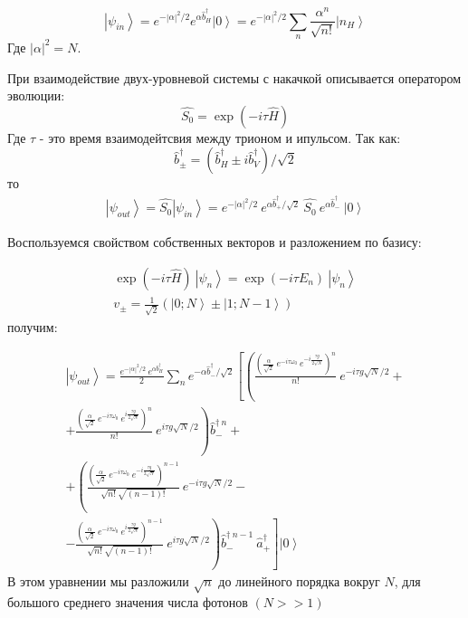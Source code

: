\documentclass[11pt]{article}    %
\begin{document}
\begin{equation}
    \left| \psi_{in} \right> = e^{-\left| \alpha \right|^2 / 2} e^{\alpha \hat{b}^{\dag}_H} \left| 0 \right> = e^{-\left| \alpha \right|^2 / 2} \sum_n \frac{\alpha^n}{\sqrt{n!}}  \left| n_H \right>
\end{equation}
Где $ |\alpha|^2 = N $.
\par При взаимодействие двух-уровневой системы с накачкой описывается оператором эволюции:
\begin{equation}
    \hat{S_0} = \exp\left( -i \tau \hat{H} \right)
\end{equation}
Где $ \tau $ - это время взаимодейтсвия между трионом и ипульсом.
Так как:
\begin{equation}
    \hat{b}^{\dag}_{\pm} = \left( \hat{b}^{\dag}_{H} \pm i \hat{b}^{\dag}_{V} \right) / \sqrt{2}
\end{equation}
то
\begin{gather}
    \left| \psi_{out} \right> = \hat{S_0} \left| \psi_{in} \right> = e^{-\left| \alpha \right|^2 / 2} \ e^{\alpha \hat{b}^{\dag}_{+} / \sqrt{2}} \ \hat{S_0}  \ e^{\alpha \hat{b}^{\dag}_{-}} \ \left| 0 \right>
\end{gather}

Воспользуемся свойством собственных векторов и разложением по базису:

\begin{gather}
    \exp\left( -i \tau \hat{H} \right) \ \left| \psi_{n} \right> = \exp\left( -i \tau E_n \right) \ \left| \psi_{n} \right> \\
    v_{\pm} = \frac{1}{\sqrt{2}} \left( \left|  0; N \right> \pm \left| 1; N-1 \right> \right)
\end{gather}
получим:

\begin{gather} \nonumber
    \left| \psi_{out} \right> = \frac{e^{-\left| \alpha \right|^2 / 2} \ e^{\alpha \hat{b}^{\dag}_{H}}}{2} \sum_n e^{-\alpha \hat{b}^{\dag}_{-} / \sqrt{2}} \left[ \left( \frac{ \left( \frac{\alpha}{\sqrt{2}} \ e^{-i \tau \omega_0 } \ e^{-i \frac{\tau g}{2\sqrt{N}}} \right)^n}{n!}  \ e^{-i \tau g \sqrt{N} / 2} \right. \right. + \\ \nonumber
    +  \left. \frac{ \left( \frac{\alpha}{\sqrt{2}} \ e^{-i \tau \omega_0 } \ e^{i \frac{\tau g}{2\sqrt{N}}} \right)^n }{n!} \ e^{i \tau g \sqrt{N} / 2} \right) \hat{b}^{\dag \ n}_{-} + \\ \nonumber
    + \left( \frac{ \left( \frac{\alpha}{\sqrt{2}} \ e^{-i \tau \omega_0 } \ e^{-i \frac{\tau g}{2\sqrt{N}}} \right)^{n-1}}{\sqrt{n!} \sqrt{\left( n-1 \right)!} }  \ e^{-i \tau g \sqrt{N} / 2}  \right. - \\
    - \left. \left. \frac{ \left( \frac{\alpha}{\sqrt{2}} \ e^{-i \tau \omega_0 } \ e^{i \frac{\tau g}{2\sqrt{N}}} \right)^{n-1}}{\sqrt{n!} \sqrt{\left( n-1 \right)!} }  \ e^{i \tau g \sqrt{N} / 2} \right) \hat{b}^{\dag \ n-1}_{-} \ \hat{a}^{\dag}_{+}\right] \left| 0 \right>
\end{gather}
В этом уравнении мы разложили $\sqrt{n}$ до линейного порядка вокруг $N$, для большого среднего значения числа фотонов $\left( N >> 1 \right)$
\end{document}
